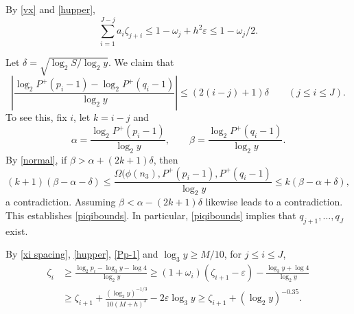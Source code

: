 \documentclass[11pt]{amsart}
\theoremstyle{remark}
\theoremstyle{plain}
\numberwithin{equation}{section}
\newcommand{\be}{\begin{equation}}
\newcommand{\ee}{\end{equation}}
\renewcommand{\a}{\ensuremath{\alpha}}
\renewcommand{\b}{\ensuremath{\beta}}
\newcommand{\eps}{\ensuremath{\varepsilon}}
\newcommand{\e}{\ensuremath{\varepsilon}}
\renewcommand{\(}{\left(}
\renewcommand{\)}{\right)}
\renewcommand{\le}{\leqslant}
\renewcommand{\ge}{\geqslant}
\renewcommand{\d}{\delta}
\newcommand{\om}{\Omega}
\begin{document}
By \eqref{vx} and \eqref{hupper},
\be\label{zetasum}
\sum_{i=1}^{J-j} a_i \zeta_{j+i} \le 1 - \omega_j + h^2 \e
\le 1 - \omega_j/2.
\ee

Let $\d=\sqrt{\log_2 S/\log_2 y}$. 
We claim that
\be\label{piqibounds}
\left| \frac{\log_2 P^+(p_i-1) - \log_2 P^+(q_i-1)}{\log_2 y} \right|
\le (2(i-j)+1)\d \qquad (j\le i\le J).
\ee
To see this, fix $i$, let $k=i-j$ and
$$
\a=\frac{\log_2 P^+(p_{i}-1)}{\log_2 y}, \qquad 
\b=\frac{\log_2 P^+(q_{i}-1)}{\log_2 y}.
$$
By \eqref{normal}, if $\b>\a+(2k+1)\d$, then 
$$
(k+1) (\b-\a-\d) \le \frac{\om(\phi(n_3),P^+(p_i-1),P^+(q_i-1)}{\log_2 y} \le k(\b-\a+\d),
$$
a contradiction.  Assuming $\b<\a-(2k+1)\d$ likewise leads to a 
contradiction.  This establishes \eqref{piqibounds}.
In particular, \eqref{piqibounds} implies that $q_{j+1},\ldots,q_J$ exist.

By \eqref{xi spacing}, \eqref{hupper}, \eqref{Pp-1} and $\log_3 y \ge M/10$,
for $j\le i\le J$,
\be\label{zetagap}
\begin{split}
\zeta_i &\ge \frac{\log_2 p_i-\log_3 y-\log 4}{\log_2 y} \ge
(1+\omega_i)(\zeta_{i+1}-\eps)-\frac{\log_3 y+\log 4}{\log_2 y} \\ &\ge 
\zeta_{i+1} + \frac{(\log_2 y)^{-1/3}}
{10(M+h)^3} - 2\eps\log_3 y \ge \zeta_{i+1} + (\log_2 y)^{-0.35}.
\end{split}\ee
\end{document}

